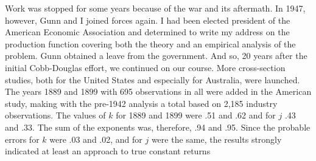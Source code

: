 \documentclass{article}
\begin{document}
Work was stopped for some years because of the war and its aftermath. In 1947, however, Gunn and I joined forces again. I had been elected president of the American Economic Association and determined to write my address on the production function covering both the theory and an empirical analysis of the problem. Gunn obtained a leave from the government. And so, 20 years after the initial Cobb-Douglas effort, we continued on our course. More cross-section studies, both for the United States and especially for Australia, were launched. The years 1889 and 1899 with 695 observations in all were added in the American study, making with the pre-1942 analysis a total based on 2,185 industry observations. The values of \(k\) for 1889 and 1899 were .51 and .62 and for \(j\) .43 and .33. The sum of the exponents was, therefore, .94 and .95. Since the probable errors for \(k\) were .03 and .02, and for \(j\) were the same, the results strongly indicated at least an approach to true constant returns %
\end{document}
